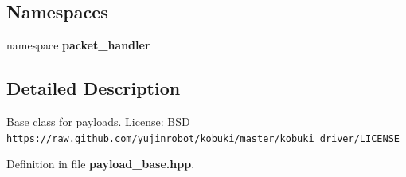 \subsection*{\-Namespaces}
\begin{DoxyCompactItemize}
\item 
namespace {\bf packet\-\_\-handler}
\end{DoxyCompactItemize}


\subsection{\-Detailed \-Description}
\-Base class for payloads. \-License\-: \-B\-S\-D {\tt https\-://raw.\-github.\-com/yujinrobot/kobuki/master/kobuki\-\_\-driver/\-L\-I\-C\-E\-N\-S\-E} 

\-Definition in file {\bf payload\-\_\-base.\-hpp}.

